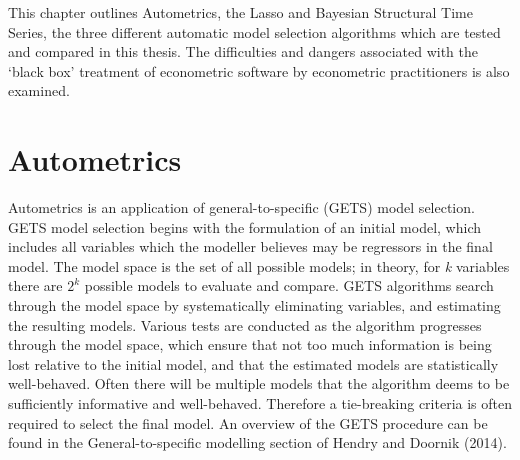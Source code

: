 This chapter outlines Autometrics, the Lasso and Bayesian Structural Time Series, the three different automatic model selection algorithms which are tested and compared in this thesis. The difficulties and dangers associated with the `black box' treatment of econometric software by econometric practitioners is also examined. 


\section{Autometrics}

Autometrics is an application of general-to-specific (GETS) model selection. GETS model selection begins with the formulation of an initial model, which includes all variables which the modeller believes may be regressors in the final model. The model space is the set of all possible models; in theory, for \textit{k} variables there are $2^{k}$ possible models to evaluate and compare. GETS algorithms search through the model space by systematically eliminating variables, and estimating the resulting models. Various tests are conducted as the algorithm progresses through the model space, which ensure that not too much information is being lost relative to the initial model, and that the estimated models are statistically well-behaved. Often there will be multiple models that the algorithm deems to be sufficiently informative and well-behaved. Therefore a tie-breaking criteria is often required to select the final model. An overview of the GETS procedure can be found in the General-to-specific modelling section of Hendry and Doornik (2014).  

